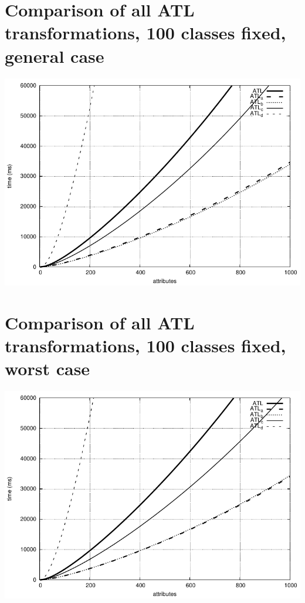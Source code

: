 \documentclass[a4paper,final]{article}
\begin{document}
\section*{Comparison of all ATL transformations, 100 classes fixed, general case}
\includegraphics[width=\textwidth]{atl_compared_general_100classes}

\section*{Comparison of all ATL transformations, 100 classes fixed, worst case}
\includegraphics[width=\textwidth]{atl_compared_worst_100classes}
\end{document}
